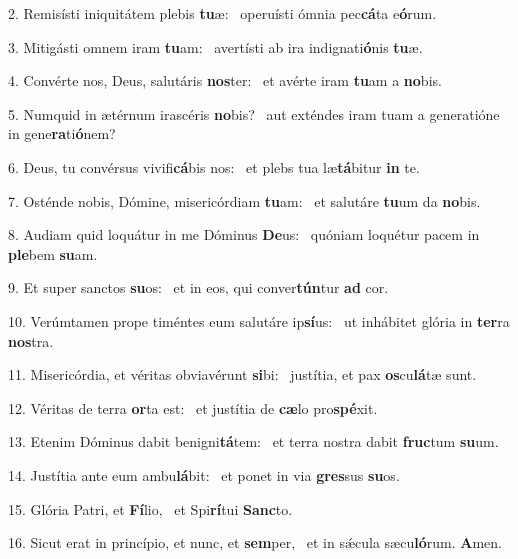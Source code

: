 2. Remisísti iniquitátem plebis \textbf{tu}æ: \ast\  operuísti ómnia pec\textbf{cá}ta e\textbf{ó}rum.\

3. Mitigásti omnem iram \textbf{tu}am: \ast\  avertísti ab ira indignati\textbf{ó}nis \textbf{tu}æ.\

4. Convérte nos, Deus, salutáris \textbf{nos}ter: \ast\  et avérte iram \textbf{tu}am a \textbf{no}bis.\

5. Numquid in ætérnum irascéris \textbf{no}bis? \ast\  aut exténdes iram tuam a generatióne in gene\textbf{ra}ti\textbf{ó}nem?\

6. Deus, tu convérsus vivifi\textbf{cá}bis nos: \ast\  et plebs tua læ\textbf{tá}bitur \textbf{in} te.\

7. Osténde nobis, Dómine, misericórdiam \textbf{tu}am: \ast\  et salutáre \textbf{tu}um da \textbf{no}bis.\

8. Audiam quid loquátur in me Dóminus \textbf{De}us: \ast\  quóniam loquétur pacem in \textbf{ple}bem \textbf{su}am.\

9. Et super sanctos \textbf{su}os: \ast\  et in eos, qui conver\textbf{tún}tur \textbf{ad} cor.\

10. Verúmtamen prope timéntes eum salutáre ip\textbf{sí}us: \ast\  ut inhábitet glória in \textbf{ter}ra \textbf{nos}tra.\

11. Misericórdia, et véritas obviavérunt \textbf{si}bi: \ast\  justítia, et pax \textbf{os}cu\textbf{lá}tæ sunt.\

12. Véritas de terra \textbf{or}ta est: \ast\  et justítia de \textbf{cæ}lo pro\textbf{spé}xit.\

13. Etenim Dóminus dabit benigni\textbf{tá}tem: \ast\  et terra nostra dabit \textbf{fruc}tum \textbf{su}um.\

14. Justítia ante eum ambu\textbf{lá}bit: \ast\  et ponet in via \textbf{gres}sus \textbf{su}os.\

15. Glória Patri, et \textbf{Fí}lio, \ast\  et Spi\textbf{rí}tui \textbf{Sanc}to.\

16. Sicut erat in princípio, et nunc, et \textbf{sem}per, \ast\  et in sǽcula sæcu\textbf{ló}rum. \textbf{A}men.\

